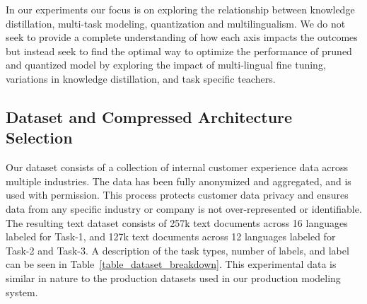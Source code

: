 \documentclass[letterpaper]{article} %
\begin{document}
In our experiments our focus is on exploring the relationship between knowledge distillation, multi-task modeling, quantization and multilingualism. 
We do not seek to provide a complete understanding of how each axis impacts the outcomes but instead seek to find the optimal way to optimize the performance of pruned and quantized model by exploring the impact of multi-lingual fine tuning, variations in knowledge distillation, and task specific teachers.

\subsection*{Dataset and Compressed Architecture Selection}
Our dataset consists of a collection of internal customer experience data across multiple industries.
The data has been fully anonymized and aggregated, and is used with permission.
This process protects customer data privacy and ensures data from any specific industry or company is not over-represented or identifiable.
The resulting text dataset consists of 257k text documents across 16 languages labeled for Task-1, and 127k text documents across 12 languages labeled for Task-2 and Task-3.
A description of the task types, number of labels, and label can be seen in Table~\ref{table_dataset_breakdown}.
This experimental data is similar in nature to the production datasets used in our production modeling system.
\end{document}
